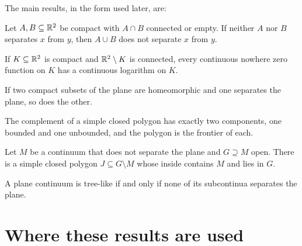 The main results, in the form used later, are:

\begin{theorem}
Let $A,B\subseteq\mathbb{R}^2$ be compact with $A\cap B$ connected or empty. If neither $A$ nor $B$
separates $x$ from $y$, then $A\cup B$ does not separate $x$ from $y$.
\end{theorem}

\begin{theorem}
If $K\subseteq\mathbb{R}^2$ is compact and $\mathbb{R}^2\setminus K$ is connected, every continuous nowhere zero
function on $K$ has a continuous logarithm on $K$.
\end{theorem}

\begin{theorem}
If two compact subsets of the plane are homeomorphic and one separates the plane, so does the other.
\end{theorem}

\begin{theorem}
The complement of a simple closed polygon has exactly two components, one bounded and one unbounded,
and the polygon is the frontier of each.
\end{theorem}

\begin{theorem}
Let $M$ be a continuum that does not separate the plane and $G\supseteq M$ open. There is a simple
closed polygon $J\subseteq G\setminus M$ whose inside contains $M$ and lies in $G$.
\end{theorem}

\begin{theorem}
A plane continuum is tree-like if and only if none of its subcontinua separates the plane.
\end{theorem}

\section{Where these results are used}

